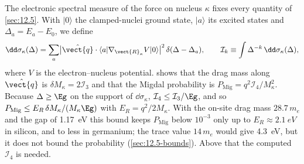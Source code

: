 The electronic spectral measure of the force on nucleus $\kappa$ fixes every quantity of \cref{sec:12.5}. With $|0\rangle$ the clamped-nuclei ground state, $|a\rangle$ its excited states and $\Delta_a = E_a - E_0$, we define
\begin{equation}
  \dd\sigma_\kappa(\Delta) = \sum_a \bigl|\hat{\vect{q}}\cdot\langle a|\nabla_{\vect{R}_\kappa}V|0\rangle\bigr|^2\,\delta(\Delta - \Delta_a) ,
  \qquad
  \mathcal{I}_k \equiv \int \Delta^{-k}\,\dd\sigma_\kappa(\Delta) ,
  \label{eq:E.18-moments}
\end{equation}
where $V$ is the electron--nucleus potential.  shows that the drag mass along $\hat{\vect{q}}$ is $\delta M_\kappa = 2\mathcal{I}_3$ and that the Migdal probability is $P_{\mathrm{Mig}} = q^2\mathcal{I}_4/M_\kappa^2$. Because $\Delta \ge \Eg$ on the support of $\dd\sigma_\kappa$, $\mathcal{I}_4 \le \mathcal{I}_3/\Eg$, and so $P_{\mathrm{Mig}} \le E_R\,\delta M_\kappa/(M_\kappa\Eg)$ with $E_R = q^2/2M_\kappa$. With the on-site drag mass $28.7\,m_e$ and the gap of \SI{1.17}{eV} this bound keeps $P_{\mathrm{Mig}}$ below $10^{-3}$ only up to $E_R \approx \SI{2.1}{eV}$ in silicon, and to less in germanium; the trace value $14\,m_e$ would give \SI{4.3}{eV}, but it does not bound the probability (\cref{sec:12.5-bounds}). Above that the computed $\mathcal{I}_4$ is needed.

